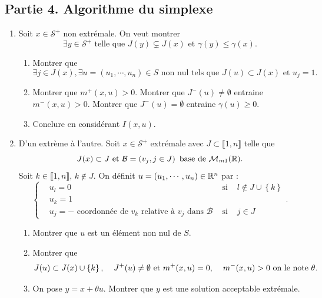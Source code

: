 \subsection*{Partie 4. Algorithme du simplexe}
\begin{enumerate}
  \item Soit $x \in \mathcal{S}^+$ non extrémale. On veut montrer
\[
\exists y \in \mathcal{S}^+ \text{ telle que } J(y) \subsetneq J(x) \text{ et } \gamma(y) \leq \gamma(x).
\]
  \begin{enumerate}
    \item Montrer que 
\[
  \exists j\in J(x), \exists u =(u_1, \cdots,u_n) \in S \text{ non nul tels que } J(u) \subset J(x) \text{ et } u_j = 1.
\]
    \item Montrer que $m^+(x,u) > 0$. Montrer que $J^-(u) \neq \emptyset$ entraine $m^-(x,u) > 0$. Montrer que $J^-(u) = \emptyset$ entraine $\gamma(u) \geq 0$.
    \item Conclure en considérant $I(x,u)$.
  \end{enumerate}
 
  \item D'un extrème à l'autre.\newline
Soit $x \in \mathcal{S}^+$ extrémale avec $J \subset \llbracket 1,n \rrbracket$ telle que 
\[
  J(x) \subset J \text{ et } \mathcal{B} = \left( v_j, j\in J\right) \text{ base de } \mathcal{M}_{m 1}(\mathbb{R}).
\] 
Soit $k \in \llbracket 1,n \rrbracket,\, k \notin J$. On définit $u = (u_1, \cdots, u_n) \in \mathbb{R}^n$ par :
\[
\left\lbrace
  \begin{aligned}
    &u_l = 0 &\text{ si }& l \notin J \cup \left\lbrace k\right\rbrace\\
    &u_k = 1 & & \\
    &u_j = - \text{ coordonnée de $v_k$ relative à } v_j \text{ dans } \mathcal{B} &\text{ si }& j \in J
  \end{aligned}
\right. .
\]
  \begin{enumerate}
    \item Montrer que $u$ est un élément non nul de $S$.
    \item Montrer que 
\[
  J(u) \subset J(x) \cup \left\lbrace k\right\rbrace, \hspace{0.4cm}
  J^+(u) \neq \emptyset \text{ et } m^+(x,u) = 0, \hspace{0.4cm}
  m^-(x,u) > 0 \text{ on le note $\theta$}.
\]
    \item On pose $y = x + \theta u$. Montrer que $y$ est une solution acceptable extrémale. 
   \end{enumerate}
  

\end{enumerate}
